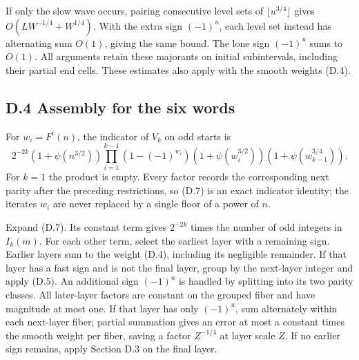 \documentclass[11pt,a4paper]{article}
\begin{document}
If only the slow wave occurs, pairing consecutive level sets of
\(\lfloor u^{3/4}\rfloor\) gives \(O(LW^{-1/4}+W^{1/4})\). With the
extra sign \((-1)^u\), each level set instead has alternating sum
\(O(1)\), giving the same bound. The lone sign \((-1)^u\) sums to
\(O(1)\). All arguments retain these majorants on initial subintervals,
including their partial end cells. These estimates also apply with the
smooth weights (D.4).

\subsection{D.4 Assembly for the six
words}\label{d.4-assembly-for-the-six-words}

For \(w_i=F^i(n)\), the indicator of \(V_k\) on odd starts is \[
2^{-2k}(1+\psi(n^{3/2}))
 \prod_{i=1}^{k-1}(1-(-1)^{w_i})(1+\psi(w_i^{3/2}))
 (1+\psi(w_{k-1}^{3/4})).
\tag{D.7}
\] For \(k=1\) the product is empty. Every factor records the
corresponding next parity after the preceding restrictions, so (D.7) is
an exact indicator identity; the iterates \(w_i\) are never replaced by
a single floor of a power of \(n\).

Expand (D.7). Its constant term gives \(2^{-2k}\) times the number of
odd integers in \(I_k(m)\). For each other term, select the earliest
layer with a remaining sign. Earlier layers sum to the weight (D.4),
including its negligible remainder. If that layer has a fast sign and is
not the final layer, group by the next-layer integer and apply (D.5). An
additional sign \((-1)^u\) is handled by splitting into its two parity
classes. All later-layer factors are constant on the grouped fiber and
have magnitude at most one. If that layer has only \((-1)^u\), sum
alternately within each next-layer fiber; partial summation gives an
error at most a constant times the smooth weight per fiber, saving a
factor \(Z^{-1/4}\) at layer scale \(Z\). If no earlier sign remains,
apply Section D.3 on the final layer.
\end{document}
